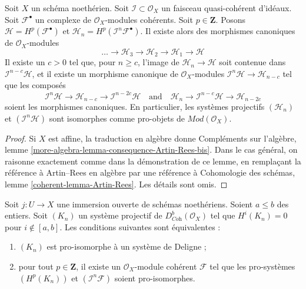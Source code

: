 \begin{lemma}
\label{lemma-consequence-Artin-Rees-bis}
Soit $X$ un schéma noethérien. Soit $\mathcal{I} \subset \mathcal{O}_X$ un faisceau quasi-cohérent d'idéaux. Soit $\mathcal{F}^\bullet$ un complexe de $\mathcal{O}_X$-modules cohérents. Soit $p \in \mathbf{Z}$. Posons $\mathcal{H} = H^p(\mathcal{F}^\bullet)$ et $\mathcal{H}_n = H^p(\mathcal{I}^n\mathcal{F}^\bullet)$. Il existe alors des morphismes canoniques de $\mathcal{O}_X$-modules
$$
\ldots \to \mathcal{H}_3 \to \mathcal{H}_2 \to \mathcal{H}_1 \to \mathcal{H}
$$
Il existe un $c > 0$ tel que, pour $n \geq c$, l'image de $\mathcal{H}_n \to \mathcal{H}$ soit contenue dans $\mathcal{I}^{n - c}\mathcal{H}$, et il existe un morphisme canonique de $\mathcal{O}_X$-modules $\mathcal{I}^n\mathcal{H} \to \mathcal{H}_{n - c}$ tel que les composés
$$
\mathcal{I}^n \mathcal{H} \to \mathcal{H}_{n - c} \to
\mathcal{I}^{n - 2c}\mathcal{H}
\quad\text{and}\quad
\mathcal{H}_n \to \mathcal{I}^{n - c}\mathcal{H} \to \mathcal{H}_{n - 2c}
$$
soient les morphismes canoniques. En particulier, les systèmes projectifs $(\mathcal{H}_n)$ et $(\mathcal{I}^n\mathcal{H})$ sont isomorphes comme pro-objets de $\textit{Mod}(\mathcal{O}_X)$.
\end{lemma}

\begin{proof}
Si $X$ est affine, la traduction en algèbre donne Compléments sur l'algèbre, lemme \ref{more-algebra-lemma-consequence-Artin-Rees-bis}. Dans le cas général, on raisonne exactement comme dans la démonstration de ce lemme, en remplaçant la référence à Artin–Rees en algèbre par une référence à Cohomologie des schémas, lemme \ref{coherent-lemma-Artin-Rees}. Les détails sont omis.
\end{proof}

\begin{lemma}
\label{lemma-characterize-extension-by-zero-algebra}
Soit $j : U \to X$ une immersion ouverte de schémas noethériens. Soient $a \leq b$ des entiers. Soit $(K_n)$ un système projectif de $D^b_{\textit{Coh}}(\mathcal{O}_X)$ tel que $H^i(K_n) = 0$ pour $i \not \in [a, b]$. Les conditions suivantes sont équivalentes :
\begin{enumerate}
\item $(K_n)$ est pro-isomorphe à un système de Deligne ;
\item pour tout $p \in \mathbf{Z}$, il existe un $\mathcal{O}_X$-module cohérent $\mathcal{F}$ tel que les pro-systèmes $(H^p(K_n))$ et $(\mathcal{I}^n\mathcal{F})$ soient pro-isomorphes.
\end{enumerate}
\end{lemma}

